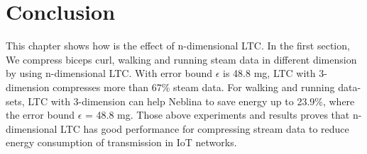 \section{Conclusion}
This chapter shows how is the effect of n-dimensional LTC. In the first section,
We compress biceps curl, walking and running steam data in different dimension
by using n-dimensional LTC. With error bound $\epsilon$ is 48.8 mg, LTC with
3-dimension compresses more than 67\% steam data. For walking and running
data-sets, LTC with 3-dimension can help Neblina to save energy up to 23.9\%,
where the error bound $\epsilon$ = 48.8 mg. Those above experiments and results
proves that n-dimensional LTC has good performance for compressing stream data
to reduce energy consumption of transmission in IoT networks.

